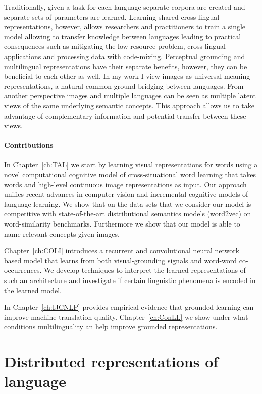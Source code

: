 Traditionally, given a task for each language separate corpora are created and
separate sets of parameters are learned.
Learning shared cross-lingual representations, however, allows researchers
and practitioners to train a single model allowing to transfer knowledge
between languages leading to practical consequences
such as mitigating the low-resource problem, cross-lingual applications and
processing data with code-mixing.
Perceptual grounding and multilingual representations have their separate benefits,
however, they can be beneficial to each other as well.
In my work I view images as universal meaning representations, a natural common
ground bridging between languages. From another perspective images and multiple
languages can be seen as multiple latent views of the same underlying semantic
concepts. This approach allows us to take advantage of complementary information
and potential transfer between these views.

\paragraph{Contributions}
In Chapter~\ref{ch:TAL} we start by learning visual representations for words using a
novel computational cognitive model of cross-situational word learning that
takes words and high-level continuous image representations as input. Our approach
unifies recent advances in computer vision and incremental cognitive models
of language learning. We show that on the data sets that we consider our model
is competitive with state-of-the-art distributional semantics models (word2vec)
on word-similarity benchmarks. Furthermore we show that our model is able to
name relevant concepts given images.

Chapter~\ref{ch:COLI} introduces a recurrent and convolutional neural network
based model that learns from both visual-grounding signals and
word-word co-occurrences. We develop techniques to interpret the learned
representations of such an architecture and investigate if certain linguistic
phenomena is encoded in the learned model.

In Chapter~\ref{ch:IJCNLP} provides empirical evidence that grounded learning
can improve machine translation quality.
Chapter~\ref{ch:ConLL} we show under what conditions multilinguality an help improve grounded
representations.

\section{Distributed representations of language}

